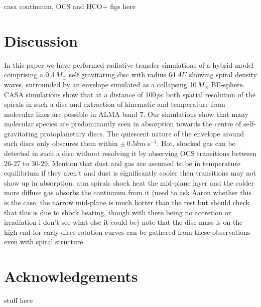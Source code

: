 \documentclass[useAMS,usenatbib]{mn2e}
\begin{document}


casa continuum, OCS and HCO+ figs here


\section{Discussion}

In this paper we have performed radiative transfer simulations of a hybrid model comprising a 0.4$\, M_\odot$ self gravitating disc with radius 64$\,AU$ showing spiral density waves, surrounded by an envelope simulated as a collapsing 10$\,M_\odot$ BE-sphere. CASA simulations show that at a distance of 100$\,pc$ both spatial resolution of the spirals in such a disc and extraction of kinematic and temperature from molecular lines are possible in ALMA band 7. Our simulations show that many  molecular species are predominantly seen in absorption towards the centre of  self-gravitating protoplanetary discs.\newline
The quiescent nature of the envelope around such discs only obscures them within $\pm\,0.5 km\,s^{-1}$.\newline
Hot, shocked gas can be detected in such a disc without resolving it by observing OCS transitions between 26-27 to 30-29.\newline
Mention that dust and gas are assumed to be in temperature equilibrium if they aren't and dust is significantly cooler then transitions may not show up in absorption. atm spirals shock heat the mid-plane layer and the colder more diffuse gas absorbs the continuum from it (need to ask Aaron whether this is the case, the narrow mid-plane is much hotter than the rest but should check that this is due to shock heating, though with there being no accretion or irradiation i don't see what else it could be)\newline
note that the disc mass is on the high end for early discs\newline
rotation curves can be gathered from these observations even with spiral structure\newline




\section*{Acknowledgements}

stuff here
\end{document}
